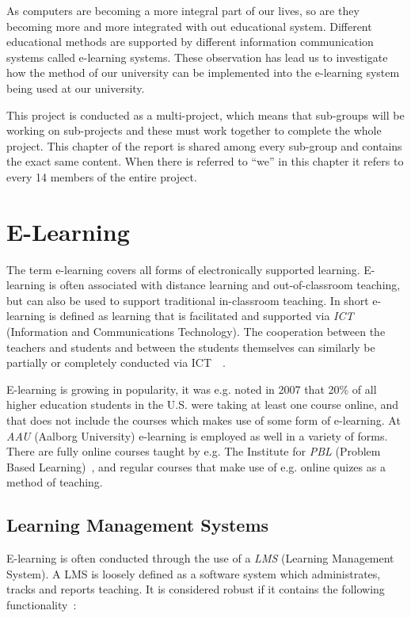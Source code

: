 As computers are becoming a more integral part of our lives, so are they becoming more and more integrated with out educational system.
Different educational methods are supported by different information communication systems called e-learning systems.
These observation has lead us to investigate how the method of our university can be implemented into the e-learning system being used at our university.

This project is conducted as a multi-project, which means that sub-groups will be working on sub-projects and these must work together to complete the whole project.
This chapter of the report is shared among every sub-group and contains the exact same content.
When there is referred to ``we'' in this chapter it refers to every 14 members of the entire project.

\section{E-Learning}\label{sec:e-learning}
The term e-learning covers all forms of electronically supported learning. E-learning is often associated with distance learning and out-of-classroom teaching, but can also be used to support traditional in-classroom teaching. In short e-learning is defined as learning that is facilitated and supported via \emph{ICT} (Information and Communications Technology). The cooperation between the teachers and students and between the students themselves can similarly be partially or completely conducted via ICT~\cite{def-e-learning1}~\cite{def-e-learning2}.

E-learning is growing in popularity, it was e.g. noted in 2007 that 20\% of all higher education students in the U.S. were taking at least one course online, and that does not include the courses which makes use of some form of e-learning.	At \emph{AAU} (Aalborg University) e-learning is employed as well in a variety of forms. There are fully online courses taught by e.g. The Institute for \emph{PBL} (Problem Based Learning)~\cite{mpbl}, and regular courses that make use of e.g. online quizes as a method of teaching. 

\subsection{Learning Management Systems}
E-learning is often conducted through the use of a \emph{LMS} (Learning Management System). A LMS is loosely defined as a software system which administrates, tracks and reports teaching. It is considered robust if it contains the following functionality~\citep{Ellis09}:

